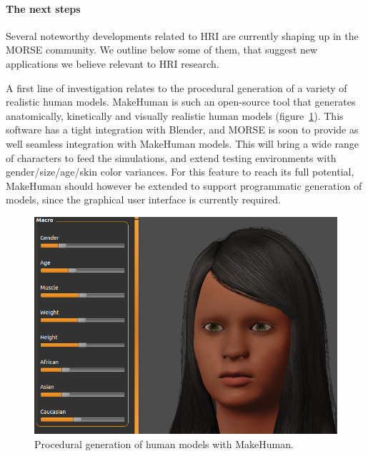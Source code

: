 \documentclass[conference]{IEEEtran}
\begin{document}
\paragraph*{The next steps}

Several noteworthy developments related to HRI are currently shaping up in the
MORSE community. We outline below some of them, that suggest new applications we
believe relevant to HRI research.

A first line of investigation relates to the procedural generation of a variety
of realistic human models. {\sc MakeHuman} is such an open-source tool that
generates anatomically, kinetically and visually realistic human models
(figure~\ref{fig:makehuman}). This software has a tight integration with Blender,
and MORSE is soon to provide as well seamless integration with {\sc MakeHuman}
models. This will bring a wide range of characters to feed the simulations,
and extend testing environments with gender/size/age/skin color variances.  For
this feature to reach its full potential, {\sc MakeHuman} should however be
extended to support programmatic generation of models, since the graphical user
interface is currently required.

\begin{figure}[tb]
  \centering
  \includegraphics[width=.9\columnwidth]{figs/makehuman.png}
  \caption{Procedural generation of human models with {\sc MakeHuman}.}
  \label{fig:makehuman}
\end{figure}
\end{document}
